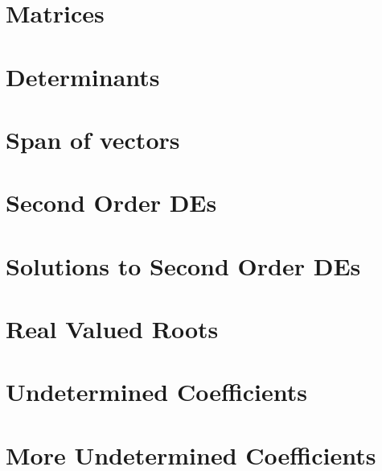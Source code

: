 \documentclass{beamer}
\begin{document}
\newcommand{\oneRowOpsThree}[6] {
      #1 & #2 & #3 & #4 & #5 & #6 \\
}




\part{Matrices}



\part{Determinants}






\part{Span of vectors}



\part{Second Order DEs}



\part{Solutions to Second Order DEs}





\part{Real Valued Roots}



\part{Undetermined Coefficients}



\part{More Undetermined Coefficients}
\end{document}
